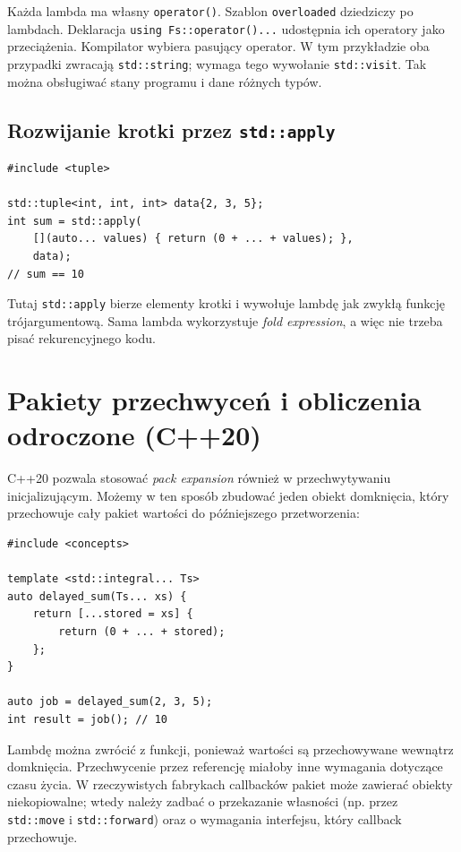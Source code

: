 Każda lambda ma własny \texttt{operator()}. Szablon
\texttt{overloaded} dziedziczy po lambdach. Deklaracja
\texttt{using Fs::operator()...} udostępnia ich operatory jako
przeciążenia. Kompilator wybiera pasujący operator. W tym
przykładzie oba przypadki zwracają \texttt{std::string}; wymaga tego
wywołanie \texttt{std::visit}. Tak można obsługiwać stany programu
i dane różnych typów.

\subsection{Rozwijanie krotki przez \texttt{std::apply}}

\begin{lstlisting}
#include <tuple>

std::tuple<int, int, int> data{2, 3, 5};
int sum = std::apply(
    [](auto... values) { return (0 + ... + values); },
    data);
// sum == 10
\end{lstlisting}

Tutaj \texttt{std::apply} bierze elementy krotki i wywołuje lambdę
jak zwykłą funkcję trójargumentową. Sama lambda wykorzystuje
\emph{fold expression}, a więc nie trzeba pisać rekurencyjnego kodu.

\section{Pakiety przechwyceń i obliczenia odroczone (C++20)}

C++20 pozwala stosować \emph{pack expansion} również w przechwytywaniu
inicjalizującym. Możemy w ten sposób zbudować jeden obiekt domknięcia,
który przechowuje cały pakiet wartości do późniejszego przetworzenia:

\begin{lstlisting}
#include <concepts>

template <std::integral... Ts>
auto delayed_sum(Ts... xs) {
    return [...stored = xs] {
        return (0 + ... + stored);
    };
}

auto job = delayed_sum(2, 3, 5);
int result = job(); // 10
\end{lstlisting}

Lambdę można zwrócić z funkcji, ponieważ wartości są przechowywane
wewnątrz domknięcia. Przechwycenie przez referencję miałoby inne
wymagania dotyczące czasu życia. W rzeczywistych fabrykach callbacków
pakiet może zawierać obiekty niekopiowalne; wtedy należy zadbać
o przekazanie własności (np. przez \texttt{std::move} i
\texttt{std::forward}) oraz o wymagania interfejsu, który callback
przechowuje.

